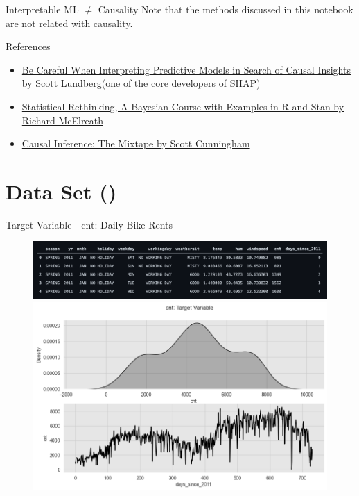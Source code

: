 \documentclass[10pt]{beamer}
\begin{document}
\begin{frame}{Interpretable ML $\neq$ Causality}
Note that the methods discussed in this notebook are not related with causality.
\begin{block}{References}
\begin{itemize}
\item \href{https://towardsdatascience.com/be-careful-when-interpreting-predictive-models-in-search-of-causal-insights-e68626e664b6}{Be Careful When Interpreting Predictive Models in Search of Causal Insights by Scott Lundberg}(one of the core developers of \href{https://shap.readthedocs.io/en/latest/index.html}{SHAP})
\item \href{https://xcelab.net/rm/statistical-rethinking/}{Statistical Rethinking, A Bayesian Course with Examples in R and Stan by Richard McElreath}
\item \href{https://mixtape.scunning.com/index.html}{Causal Inference: The Mixtape by Scott Cunningham}
\end{itemize}
\end{block}
\end{frame}

\section{Data Set (\cite{molnar2019})}

\begin{frame}{Target Variable -  cnt: Daily Bike Rents}
\begin{center}
  \begin{figure}
    \includegraphics[scale=0.35]{images/head.png} 
    \includegraphics[scale=0.4]{images/interpretable_ml_10_0.png}
  \end{figure}
\end{center}
\end{frame}
\end{document}
